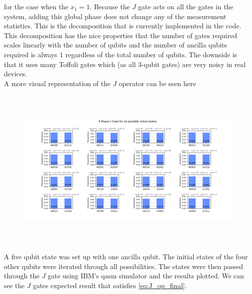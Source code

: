 \documentclass{article}
\begin{document}
\begin{onehalfspace}
for the case when the $x_1=1$. Because the $J$ gate acts on all the gates in the system, adding this global phase does not change any of the measurement statistics. This is the decomposition that is currently implemented in the code.\\

This decomposition has the nice properties that the number of gates required scales linearly with the number of qubits and the number of ancilla qubits required is always 1 regardless of the total number of qubits. The downside is that it uses many Toffoli gates which (as all 3-qubit gates) are very noisy in real devices.\\

A more visual representation of the $J$ operator can be seen here
\begin{figure}[H]
    \centering
    \includegraphics[width=18cm,height=8cm]{4plyr.png}
    \label{fig:4plyr}
\end{figure}
A five qubit state was set up with one ancilla qubit. The initial states of the four other qubits were iterated through all possibilities. The states were then passed through the $J$ gate using IBM's qasm simulator and the results plotted. We can see the $J$ gates expected result that satisfies \cref{eq:J_op_final}.

\end{onehalfspace} %
%
%
\end{document}
